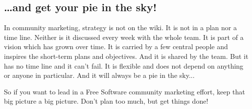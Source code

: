 \subsection*{\dots and get your pie in the sky!}
In community marketing, strategy is not on the wiki. It is not in a plan nor a time line. Neither is it discussed every week with the whole team. It is part of a vision which has grown over time. It is carried by a few central people and inspires the short-term plans and objectives. And it is shared by the team. But it has no time line and it can't fail. It is flexible and does not depend on anything or anyone in particular. And it will always be a pie in the sky...

So if you want to lead in a Free Software community marketing effort, keep that big picture a big picture. Don’t plan too much, but get things done!